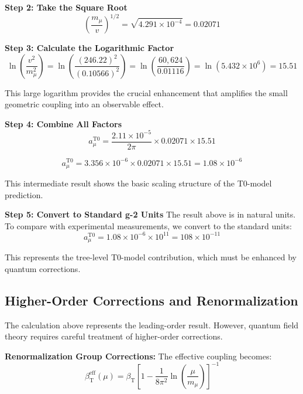 \documentclass[12pt,a4paper]{article}
\newcommand{\betaT}{\beta_{\text{T}}}
\begin{document}
	\textbf{Step 2: Take the Square Root}
	\begin{equation}
		\left(\frac{m_\mu}{v}\right)^{1/2} = \sqrt{4.291 \times 10^{-4}} = 0.02071
	\end{equation}
	
	\textbf{Step 3: Calculate the Logarithmic Factor}
	\begin{equation}
		\ln\left(\frac{v^2}{m_\mu^2}\right) = \ln\left(\frac{(246.22)^2}{(0.10566)^2}\right) = \ln\left(\frac{60,624}{0.01116}\right) = \ln(5.432 \times 10^6) = 15.51
	\end{equation}
	
	This large logarithm provides the crucial enhancement that amplifies the small geometric coupling into an observable effect.
	
	\textbf{Step 4: Combine All Factors}
	\begin{equation}
		a_\mu^{\text{T0}} = \frac{2.11 \times 10^{-5}}{2\pi} \times 0.02071 \times 15.51
	\end{equation}
	
	\begin{equation}
		a_\mu^{\text{T0}} = 3.356 \times 10^{-6} \times 0.02071 \times 15.51 = 1.08 \times 10^{-6}
	\end{equation}
	
	This intermediate result shows the basic scaling structure of the T0-model prediction.
	
	\textbf{Step 5: Convert to Standard g-2 Units}
	The result above is in natural units. To compare with experimental measurements, we convert to the standard units:
	\begin{equation}
		a_\mu^{\text{T0}} = 1.08 \times 10^{-6} \times 10^{11} = 108 \times 10^{-11}
	\end{equation}
	
	This represents the tree-level T0-model contribution, which must be enhanced by quantum corrections.
	
	\subsection{Higher-Order Corrections and Renormalization}
	
	The calculation above represents the leading-order result. However, quantum field theory requires careful treatment of higher-order corrections.
	
	\textbf{Renormalization Group Corrections:}
	The effective coupling becomes:
	\begin{equation}
		\betaT^{\text{eff}}(\mu) = \betaT \left[1 - \frac{1}{8\pi^2} \ln\left(\frac{\mu}{m_\mu}\right)\right]^{-1}
	\end{equation}
	
\end{document}
